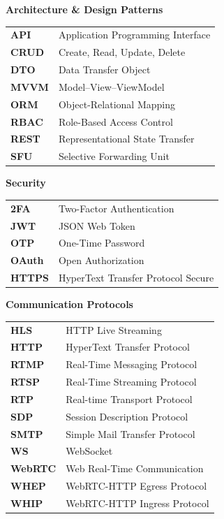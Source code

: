 \documentclass[12pt,a4paper,oneside]{report}
\begin{document}
\textbf{Architecture \& Design Patterns}\\[4pt]
\begin{tabular}{@{}p{3cm}l@{}}
\textbf{API}     & Application Programming Interface \\
\textbf{CRUD}    & Create, Read, Update, Delete \\
\textbf{DTO}     & Data Transfer Object \\
\textbf{MVVM}    & Model--View--ViewModel \\
\textbf{ORM}     & Object-Relational Mapping \\
\textbf{RBAC}    & Role-Based Access Control \\
\textbf{REST}    & Representational State Transfer \\
\textbf{SFU}     & Selective Forwarding Unit \\
\end{tabular}

\vspace{12pt}
\textbf{Security}\\[4pt]
\begin{tabular}{@{}p{3cm}l@{}}
\textbf{2FA}     & Two-Factor Authentication \\
\textbf{JWT}     & JSON Web Token \\
\textbf{OTP}     & One-Time Password \\
\textbf{OAuth}   & Open Authorization \\
\textbf{HTTPS}   & HyperText Transfer Protocol Secure \\
\end{tabular}

\vspace{12pt}
\textbf{Communication Protocols}\\[4pt]
\begin{tabular}{@{}p{3cm}l@{}}
\textbf{HLS}     & HTTP Live Streaming \\
\textbf{HTTP}    & HyperText Transfer Protocol \\
\textbf{RTMP}    & Real-Time Messaging Protocol \\
\textbf{RTSP}    & Real-Time Streaming Protocol \\
\textbf{RTP}     & Real-time Transport Protocol \\
\textbf{SDP}     & Session Description Protocol \\
\textbf{SMTP}    & Simple Mail Transfer Protocol \\
\textbf{WS}      & WebSocket \\
\textbf{WebRTC}  & Web Real-Time Communication \\
\textbf{WHEP}    & WebRTC-HTTP Egress Protocol \\
\textbf{WHIP}    & WebRTC-HTTP Ingress Protocol \\
\end{tabular}
\end{document}
